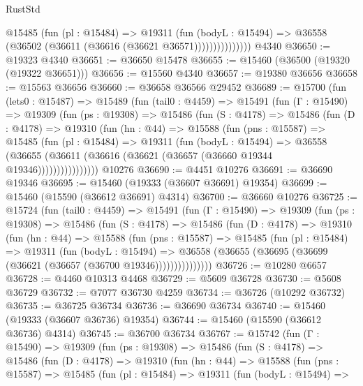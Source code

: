 \begin{lexlean}{RustStd}
\begin{coremodule}
                    @15485
                      (fun (pl : @15484) =>
                      @19311
                        (fun (bodyL : @15494) =>
                        @36558 (@36502 (@36611 (@36616 (@36621 @36571)))))))))))))))
    @4340
@36650 := @19323 @4340
@36651 := @36650 @15478
@36655 := @15460 (@36500 (@19320 (@19322 @36651)))
@36656 := @15560 @4340
@36657 := @19380 @36656
@36658 := @15563 @36656
@36660 := @36658 @36566 @29452
@36689 := @15700
    (fun (lets0 : @15487) =>
    @15489
      (fun (tail0 : @4459) =>
      @15491
        (fun (Γ : @15490) =>
        @19309
          (fun (ps : @19308) =>
          @15486
            (fun (S : @4178) =>
            @15486
              (fun (D : @4178) =>
              @19310
                (fun (hn : @44) =>
                @15588
                  (fun (pns : @15587) =>
                  @15485
                    (fun (pl : @15484) =>
                    @19311
                      (fun (bodyL : @15494) =>
                      @36558
                        (@36655
                          (@36611 (@36616 (@36621 (@36657 (@36660 @19344 @19346))))))))))))))))
    @10276
@36690 := @4451 @10276
@36691 := @36690 @19346
@36695 := @15460 (@19333 (@36607 @36691) @19354)
@36699 := @15460 (@15590 (@36612 @36691) @4314)
@36700 := @36660 @10276
@36725 := @15724
    (fun (tail0 : @4459) =>
    @15491
      (fun (Γ : @15490) =>
      @19309
        (fun (ps : @19308) =>
        @15486
          (fun (S : @4178) =>
          @15486
            (fun (D : @4178) =>
            @19310
              (fun (hn : @44) =>
              @15588
                (fun (pns : @15587) =>
                @15485
                  (fun (pl : @15484) =>
                  @19311
                    (fun (bodyL : @15494) =>
                    @36558 (@36655 (@36695 (@36699 (@36621 (@36657 (@36700 @19346)))))))))))))))
@36726 := @10280 @6657
@36728 := @4460 @10313 @4468
@36729 := @5609 @36728
@36730 := @5608 @36729
@36732 := @7077 @36730 @4259
@36734 := @36726 (@10292 @36732)
@36735 := @36725 @36734
@36736 := @36690 @36734
@36740 := @15460 (@19333 (@36607 @36736) @19354)
@36744 := @15460 (@15590 (@36612 @36736) @4314)
@36745 := @36700 @36734
@36767 := @15742
    (fun (Γ : @15490) =>
    @19309
      (fun (ps : @19308) =>
      @15486
        (fun (S : @4178) =>
        @15486
          (fun (D : @4178) =>
          @19310
            (fun (hn : @44) =>
            @15588
              (fun (pns : @15587) =>
              @15485
                (fun (pl : @15484) =>
                @19311
                  (fun (bodyL : @15494) =>

\end{coremodule}
\end{lexlean}

